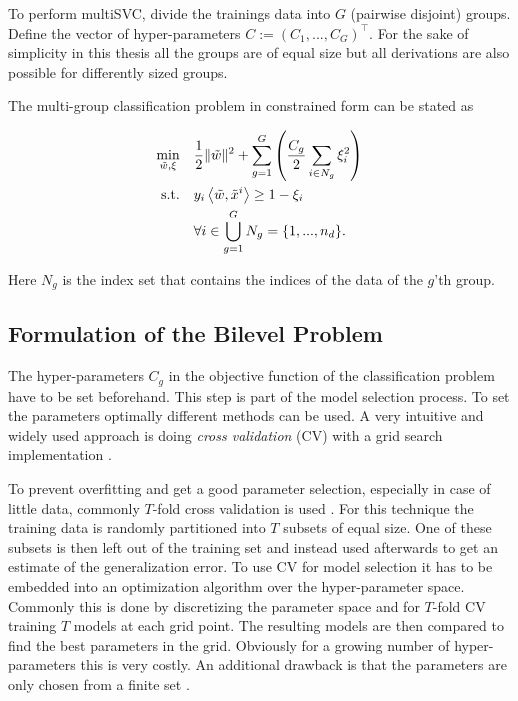 To perform multiSVC, divide the trainings data into \(G\) (pairwise disjoint) groups.
Define the vector of hyper-parameters \(C := (C_1,...,C_G)^{\top}\). For the sake of simplicity in this thesis all the groups are of equal size but all derivations are also possible for differently sized groups.

The multi-group classification problem in constrained form can be stated as 

\begin{align}
\begin{split}
	\min_{\tilde{w},\xi} \quad & \frac{1}{2} \|\tilde{w}\|^2+\sum_{g = 1}^G\left(\frac{C_g}{2}\sum_{i \in N_g} {\xi_i^2}\right) \vspace{0.5ex}\\
	\text{s.t.} \quad & y_i\Langle \tilde{w},\tilde{x}^i\Rangle \geq 1 - \xi_i \vspace{0.5ex}\\
	& 	\forall i \in \bigcup_{g =1}^G N_g =\{1,...,n_d\}.
\end{split}
\label{MultiSVC_QP}
\end{align}

Here \(N_g\) is the index set that contains the indices of the data of the \(g\)'th group.


\subsection{Formulation of the Bilevel Problem}


The hyper-parameters \(C_g\) in the objective function of the classification problem have to be set beforehand. This step is part of the model selection process.
To set the parameters optimally different methods can be used.
A very intuitive and widely used approach is doing \emph{cross validation} (CV) with a grid search implementation \cite[p. 30]{Kunapuli2008}.

To prevent overfitting and get a good parameter selection, especially in case of little data, commonly \(T\)-fold cross validation is used \cite[p. 30]{Kunapuli2008}.
For this technique the training data is randomly partitioned into \(T\) subsets of equal size. One of these subsets is then left out of the training set and instead used afterwards to get an estimate of the generalization error. 
To use CV for model selection it has to be embedded into an optimization algorithm over the hyper-parameter space. 
Commonly this is done by discretizing the parameter space and for \(T\)-fold CV training \(T\) models at each grid point. The resulting models are then compared to find the best parameters in the grid.
Obviously for a growing number of hyper-parameters this is very costly. An additional drawback is that the parameters are only chosen from a finite set \cite[p. 30]{Kunapuli2008}.

